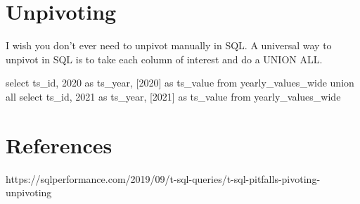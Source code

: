 \documentclass[
  letterpaper,
  DIV=11,
  numbers=noendperiod]{scrreprt}
\newenvironment{Shaded}{\begin{snugshade}}{\end{snugshade}}
\newcommand{\DecValTok}[1]{\textcolor[rgb]{0.68,0.00,0.00}{#1}}
\newcommand{\KeywordTok}[1]{\textcolor[rgb]{0.00,0.23,0.31}{#1}}
\newcommand{\NormalTok}[1]{\textcolor[rgb]{0.00,0.23,0.31}{#1}}
\newcommand{\StringTok}[1]{\textcolor[rgb]{0.13,0.47,0.30}{#1}}
\begin{document}
\hypertarget{unpivoting}{%
\chapter{Unpivoting}\label{unpivoting}}

I wish you don't ever need to unpivot manually in SQL. A universal way
to unpivot in SQL is to take each column of interest and do a UNION ALL.

\begin{Shaded}
\begin{Highlighting}[]

\KeywordTok{select} 
\NormalTok{  ts\_id, }
  \StringTok{\textquotesingle{}2020\textquotesingle{}} \KeywordTok{as}\NormalTok{ ts\_year, }
\NormalTok{  [}\DecValTok{2020}\NormalTok{] }\KeywordTok{as}\NormalTok{ ts\_value}
\KeywordTok{from}\NormalTok{ yearly\_values\_wide}
\KeywordTok{union} \KeywordTok{all}
\KeywordTok{select} 
\NormalTok{  ts\_id, }
  \StringTok{\textquotesingle{}2021\textquotesingle{}} \KeywordTok{as}\NormalTok{ ts\_year, }
\NormalTok{  [}\DecValTok{2021}\NormalTok{] }\KeywordTok{as}\NormalTok{ ts\_value}
\KeywordTok{from}\NormalTok{ yearly\_values\_wide}

\end{Highlighting}
\end{Shaded}


\hypertarget{references-1}{%
\chapter{References}\label{references-1}}

https://sqlperformance.com/2019/09/t-sql-queries/t-sql-pitfalls-pivoting-unpivoting
\end{document}
